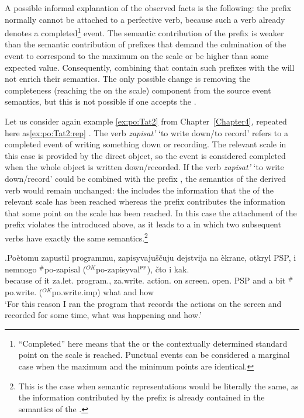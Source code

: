 A possible informal explanation of the observed facts is the following: the  prefix  normally cannot be attached to a perfective verb, because such a verb already denotes a completed\footnote{``Completed'' here means that the  or the contextually determined standard point on the scale is reached. Punctual events can be considered a marginal case when the maximum and the minimum points are identical.} event. The semantic contribution of the prefix  is weaker than the semantic contribution of prefixes that demand the culmination of the event to correspond to the maximum on the scale or be higher than some expected value. Consequently, combining  that contain such prefixes with the   will not enrich their semantics. The only possible change is removing the completeness (reaching the  on the scale) component from the source event semantics, but this is not possible if one accepts the  \citep{Kiparsky:82}.\largerpage[2]

Let us consider again example \ref{ex:po:Tat2} from Chapter~\ref{Chapter4}, repeated here as\ref{ex:po:Tat2:rep} \citet{Tatevosov:09}. The verb \textit{zapisat'} `to write down/to record' refers to a completed event of writing something down or recording. The relevant scale in this case is provided by the direct object, so the event is considered completed when the whole object is written down/recorded. If the verb \textit{zapisat'} `to write down/record' could be combined with the  prefix , the semantics of the derived verb would remain unchanged: the  includes the information that the  of the relevant scale has been reached whereas the prefix contributes the information that some point on the scale has been reached. In this case the attachment of the prefix violates the  introduced above, as it leads to a  in which two subsequent verbs have exactly the same semantics.\footnote{This is the case when semantic representations would be literally the same, as the information contributed by the prefix is already contained in the semantics of the .}

\exg.\label{ex:po:Tat2:rep}Po\`{e}tomu zapustil programmu, zapisyvaju\v{s}\v{c}uju dejstvija na \`{e}krane, otkryl PSP, i nemnogo $^\#$po-zapisal ($^{\textit{OK}}$po-zapisyval$^{\textsc{pf}}$), \v{c}to i kak.\\
{because of it} za.let. program., za.write. action. on screen. open. PSP and {a bit} $^\#$po.write. ($^{\textit{OK}}$po.write.imp) what and how\\
\trans `For this reason I ran the program that records the actions on the screen and recorded for some time, what was happening and how.'\\ 

